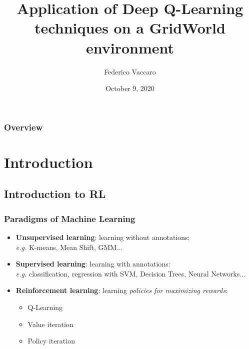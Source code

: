\documentclass{beamer}
\title[Multiagent Systems course project]{Application of Deep Q-Learning techniques on a GridWorld environment} %
\author{Federico Vaccaro} %
\institute[UniFi] %
{
Università degli studi di Firenze \\ %
\medskip
\textit{federico.vaccaro@stud.unifi.it} %
}
\date{October 9, 2020} %
\begin{document}
\begin{frame}
\titlepage %
\end{frame}

\begin{frame}
\frametitle{Overview} %
\tableofcontents %
\end{frame}


\section{Introduction} %
\subsection{Introduction to RL}
\begin{frame}
\frametitle{Paradigms of Machine Learning}
\begin{itemize}
	\item \textbf{Unsupervised learning}: learning without annotations;\\ 
	\textit{e.g.} K-means, Mean Shift, GMM...
	\item \textbf{Supervised learning}: learning with annotations:
	\\ \textit{e.g.} classification, regression with SVM, Decision Trees, Neural Networks...
	\item \textbf{Reinforcement learning}: learning \textit{policies for maximizing rewards}:\\
	\begin{itemize}
		\item Q-Learning
		\item Value iteration 
		\item Policy iteration
	\end{itemize}
\end{itemize}
\end{frame}
\end{document}

